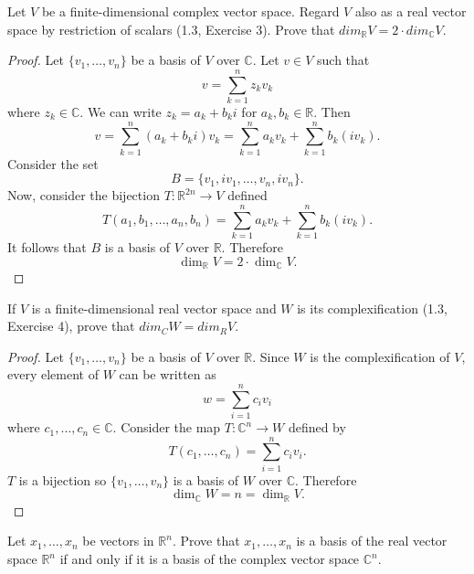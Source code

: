 \begin{tcolorbox}[title=Problem 20, breakable]
    Let $V$ be a finite-dimensional complex vector space.
    Regard $V$ also as a real vector space by restriction of scalars (1.3, Exercise 3).
    Prove that $dim_{\mathbb{R}} V = 2 \cdot dim_{\mathbb{C}} V$.
\end{tcolorbox}

\begin{proof}
    Let $\{v_1, \ldots, v_n\}$ be a basis of $V$ over $\mathbb{C}$.
    Let $v \in V$ such that
    \[
    v = \sum_{k=1}^n z_k v_k
    \]
    where $z_k \in \mathbb{C}$.
    We can write $z_k = a_k + b_k i$ for $a_k, b_k \in \mathbb{R}$.
    Then
    \[
    v = \sum_{k=1}^n (a_k + b_k i)v_k
    = \sum_{k=1}^n a_k v_k + \sum_{k=1}^n b_k (i v_k).
    \]
    Consider the set
    \[
    B = \{v_1, iv_1, \ldots, v_n, iv_n\}.
    \]
    Now, consider the bijection $T : \mathbb{R}^{2n} \to V$ defined 
    \[
    T(a_1, b_1, \ldots, a_n, b_n)
    = \sum_{k=1}^n a_k v_k + \sum_{k=1}^n b_k (i v_k).
    \]
    It follows that $B$ is a basis of $V$ over $\mathbb{R}$.
    Therefore
    \[
    \dim_{\mathbb{R}} V = 2 \cdot \dim_{\mathbb{C}} V.
    \]
\end{proof}

\begin{tcolorbox}[title=Problem 21, breakable]
    If $V$ is a finite-dimensional real vector space and $W$
    is its complexification (1.3, Exercise 4), 
    prove that $dim_C W = dim_R V$.
\end{tcolorbox}

\begin{proof}
    Let $\{v_1, \ldots, v_n\}$ be a basis of $V$ over $\mathbb{R}$.
    Since $W$ is the complexification of $V$, every element of $W$ can be written as
    \[
    w = \sum_{i=1}^n c_i v_i
    \]
    where $c_1, \ldots, c_n \in \mathbb{C}$.
    Consider the map $T : \mathbb{C}^n \longrightarrow W$ defined by
    \[
    T(c_1, \ldots, c_n) = \sum_{i=1}^n c_i v_i.
    \]
    $T$ is a bijection so $\{v_1, \ldots, v_n\}$ is a basis of $W$ over $\mathbb{C}$.
    Therefore
    \[
    \dim_{\mathbb{C}} W = n = \dim_{\mathbb{R}} V.
    \]
\end{proof}


\begin{tcolorbox}[title=Problem 22, breakable]
    Let $x_1, \ldots, x_n$ be vectors in $\mathbb{R}^n$.
    Prove that $x_1, \ldots, x_n$ is a basis of the real vector 
    space $\mathbb{R}^n$ if and only if it is a basis of the complex 
    vector space $\mathbb{C}^n$.
\end{tcolorbox}

